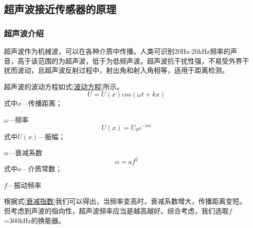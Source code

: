     \subsection{超声波接近传感器的原理}
    \subsubsection{超声波介绍}
      超声波作为机械波，可以在各种介质中传播。人类可识别20Hz-20kHz频率的声音，高于该范围的为超声波，低于为低频声波。超声波抗干扰性强，不易受外界干扰而波动，且超声波反射过程中，射出角和射入角相等，适用于距离检测。
      
      超声波的波动方程如式\ref{波动方程}所示。
    \begin{equation}
    	U=U(x)cos(\omega t+kx)
    	\label{波动方程}
    \end{equation}
	式中\quad$x$---传播距离；\par
	\quad$\omega$---频率
	\begin{equation}
		U(x)=U_0 e^{-\alpha x}
		\label{振幅方程}
	\end{equation}
	式中\quad$U(x)$---振幅；\par
		\quad$\alpha$---衰减系数
	\begin{equation}
		\alpha=a f^2
		\label{衰减指数}
	\end{equation}
	式中\quad $a$---介质常数；\par
	   \quad $f$---振动频率\par
    根据式\ref{衰减指数}我们可以得出，当频率变高时，衰减系数增大，传播距离变短。但考虑到声波的指向性，超声波频率应当是越高越好。综合考虑，我们选取$f$=300kHz的换能器。
